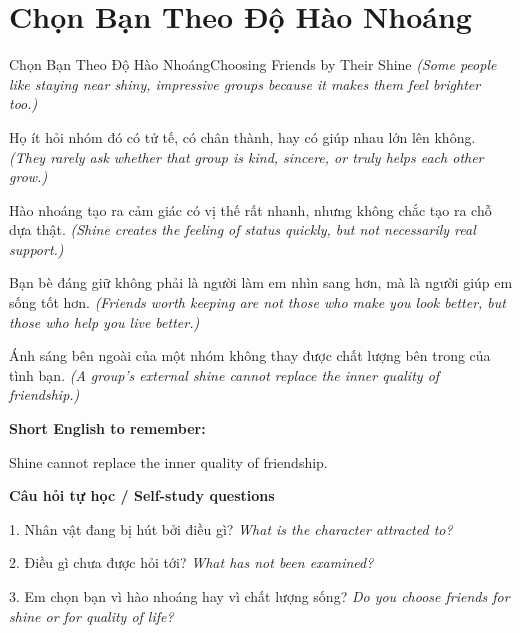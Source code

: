 \section{Chọn Bạn Theo Độ Hào Nhoáng}
\begin{truyen}{Chọn Bạn Theo Độ Hào Nhoáng}{Choosing Friends by Their Shine}
\textit{(Some people like staying near shiny, impressive groups because it makes them feel brighter too.)}

Họ ít hỏi nhóm đó có tử tế, có chân thành, hay có giúp nhau lớn lên không.
\textit{(They rarely ask whether that group is kind, sincere, or truly helps each other grow.)}

Hào nhoáng tạo ra cảm giác có vị thế rất nhanh, nhưng không chắc tạo ra chỗ dựa thật.
\textit{(Shine creates the feeling of status quickly, but not necessarily real support.)}

Bạn bè đáng giữ không phải là người làm em nhìn sang hơn, mà là người giúp em sống tốt hơn.
\textit{(Friends worth keeping are not those who make you look better, but those who help you live better.)}

\end{truyen}

\begin{baihoc}
Ánh sáng bên ngoài của một nhóm không thay được chất lượng bên trong của tình bạn.
\textit{(A group's external shine cannot replace the inner quality of friendship.)}
\end{baihoc}

\begin{ghinhoanh}
\textbf{Short English to remember:}

Shine cannot replace the inner quality of friendship.

\end{ghinhoanh}

\begin{tuhocnhanh}
\textbf{Câu hỏi tự học / Self-study questions}

1. Nhân vật đang bị hút bởi điều gì? \textit{What is the character attracted to?}

2. Điều gì chưa được hỏi tới? \textit{What has not been examined?}

3. Em chọn bạn vì hào nhoáng hay vì chất lượng sống? \textit{Do you choose friends for shine or for quality of life?}
\end{tuhocnhanh}
\ngancach


